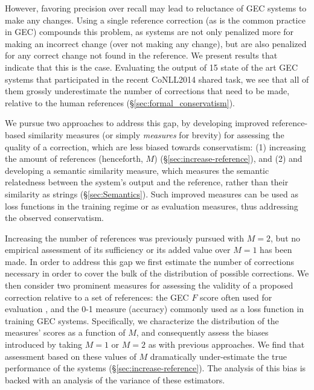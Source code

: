 \documentclass[english]{article}
\begin{document}
However, favoring precision over recall may lead to reluctance of GEC systems to make any
changes. Using a single reference correction (as is the common practice in GEC) compounds
this problem, as systems are not only penalized more for making an incorrect change (over not making
any change), but are also penalized for any correct change not found in the reference.
We present results that indicate that this is the case. Evaluating the output of 15 state of the art
GEC systems that participated in the recent CoNLL2014 shared task, we see that all of them
grossly underestimate the number of corrections that need to be made, relative to the human references
(\S\ref{sec:formal_conservatism}). 

We pursue two approaches to address this gap, by developing improved reference-based
similarity measures (or simply {\it measures} for brevity) for assessing 
the quality of a correction, which are less biased towards conservatism:
(1) increasing the amount of references (henceforth, $M$) (\S\ref{sec:increase-reference}),
and (2) and developing a semantic similarity measure, which measures the semantic relatedness
between the system's output and the reference, rather than their similarity
as strings (\S\ref{sec:Semantics}). Such improved measures can be used as
loss functions in the training regime or as evaluation measures,
thus addressing the observed conservatism.

Increasing the number of references was previously pursued with $M=2$,
but no empirical assessment of its sufficiency or its added value over $M=1$ has been made.
In order to address this gap we first estimate the number of corrections necessary in order
to cover the bulk of the distribution of possible corrections.
We then consider two prominent measures for assessing the validity of a proposed correction
relative to a set of references: the GEC $F$ score often used for evaluation \cite{dahlmeier2012better},
and the 0-1 measure (accuracy) commonly used as a loss function in training GEC systems.
Specifically, we characterize the distribution of the measures' scores
as a function of $M$, and consequently assess the biases introduced by taking $M=1$ or $M=2$
as with previous approaches. 
We find that assessment based on these values of $M$ dramatically under-estimate the
true performance of the systems (\S\ref{sec:increase-reference}). 
The analysis of this bias is backed with an analysis of the variance of these estimators.
\end{document}
